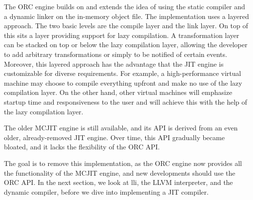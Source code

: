 The ORC engine builds on and extends the idea of using the static compiler and a dynamic linker on the in-memory object file. The implementation uses a layered approach. The two basic levels are the compile layer and the link layer. On top of this sits a layer providing support for lazy compilation. A transformation layer can be stacked on top or below the lazy compilation layer, allowing the developer to add arbitrary transformations or simply to be notified of certain events. Moreover, this layered approach has the advantage that the JIT engine is customizable for diverse requirements. For example, a high-performance virtual machine may choose to compile everything upfront and make no use of the lazy compilation layer. On the other hand, other virtual machines will emphasize startup time and responsiveness to the user and will achieve this with the help of the lazy compilation layer.

The older MCJIT engine is still available, and its API is derived from an even older, already-removed JIT engine. Over time, this API gradually became bloated, and it lacks the flexibility of the ORC API.

The goal is to remove this implementation, as the ORC engine now provides all the functionality of the MCJIT engine, and new developments should use the ORC API.
In the next section, we look at lli, the LLVM interpreter, and the dynamic compiler, before we dive into implementing a JIT compiler.








































